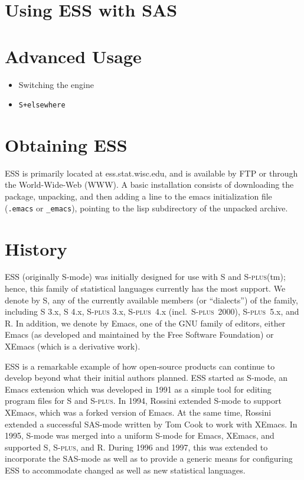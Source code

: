 \documentclass{article}
\newcommand*{\Splus}{\textsc{S-plus}}
\begin{document}
\section{Using ESS with SAS}
\label{sec:SAS}



\section{Advanced Usage}
\label{sec:advanced}

\begin{itemize}
\item Switching the engine
\item \texttt{S+elsewhere}

\end{itemize}

\section{Obtaining ESS}
\label{sec:getIt}

ESS is primarily located at ess.stat.wisc.edu, and is available by FTP
or through the World-Wide-Web (WWW).  A basic installation consists of
downloading the package, unpacking, and then adding a line to the
emacs initialization file (\verb+.emacs+ or \verb+_emacs+), pointing
to the lisp subdirectory of the unpacked archive.

\section{History}
\label{sec:history}

ESS (originally S-mode) was initially designed for use with S and
\Splus(tm); hence, this family of statistical languages currently has
the most support.  We denote by S, any of the currently available
members (or ``dialects'') of the family, including S 3.x, S 4.x, \Splus
3.x, \Splus~4.x (incl.\ \Splus~2000), \Splus~5.x, and R.  In addition, we
denote by Emacs, one of the GNU family of editors, either Emacs (as
developed and maintained by the Free Software Foundation) or XEmacs (which
is a derivative work).

ESS is a remarkable example of how open-source products can continue
to develop beyond what their initial authors planned.  ESS started as
S-mode, an Emacs extension which was developed in 1991 as a simple
tool for editing program files for S and \Splus.  In 1994, Rossini
extended S-mode to support XEmacs, which was a forked version of
Emacs.  At the same time, Rossini extended a successful SAS-mode
written by Tom Cook to work with XEmacs.  In 1995, S-mode was merged
into a uniform S-mode for Emacs, XEmacs, and supported S, \Splus, and
R. During 1996 and 1997, this was extended to incorporate the
SAS-mode as well as to provide a generic means for configuring ESS to
accommodate changed as well as new statistical languages.
\end{document}
